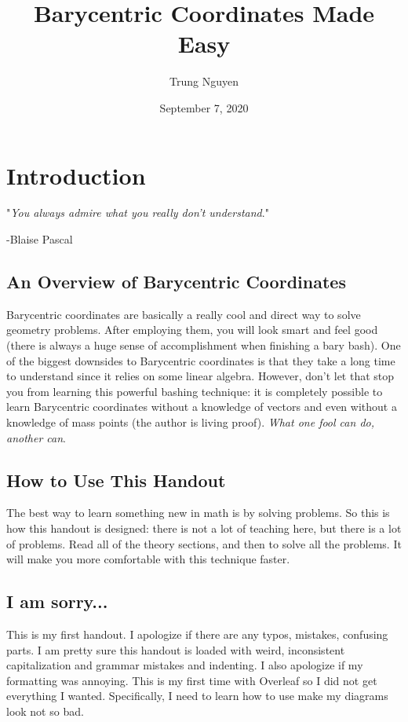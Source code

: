 \documentclass{article}
\title{Barycentric Coordinates Made Easy}
\author{Trung Nguyen}
\date{September 7, 2020}
\begin{document}
\maketitle

\section{Introduction}
\begin{center}
    "\textit{You always admire what you really don't understand}."
    
    -Blaise Pascal
\end{center}

\vspace{.1in}
\subsection{An Overview of Barycentric Coordinates}Barycentric coordinates are basically a really cool and direct way to solve geometry problems. After employing them, you will look smart and  feel good (there is always a huge sense of accomplishment when finishing a bary bash). One of the biggest downsides to Barycentric coordinates is that they take a long time to understand since it relies on some linear algebra. However, don't let that stop you from learning this powerful bashing technique: it is completely possible to learn Barycentric coordinates without a knowledge of vectors and even without a knowledge of mass points (the author is living proof). \textit{What one fool can do, another can}.
\subsection{How to Use This Handout}The best way to learn something new in math is by solving problems. So this is how this handout is designed: there is not a lot of teaching here, but there is a lot of problems. Read all of the theory sections, and then to solve all the problems. It will make you more comfortable with this technique faster. 
\subsection{I am sorry...}
This is my first handout. I apologize if there are any typos, mistakes, confusing parts. I am pretty sure this handout is loaded with weird, inconsistent capitalization and grammar mistakes and indenting.  I also apologize if my formatting was annoying. This is my first time with Overleaf so I did not get everything I wanted. Specifically, I need to learn how to use make my diagrams look not so bad. 
\end{document}
